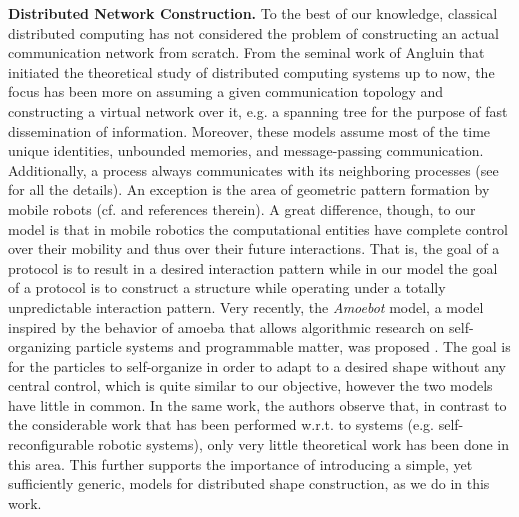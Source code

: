\documentclass[oribibl, 11pt]{llncs}
\begin{document}
\noindent\textbf{Distributed Network Construction.} To the best of our knowledge, classical distributed computing has not considered the problem of constructing an actual communication network from scratch. From the seminal work of Angluin \cite{An80} that initiated the theoretical study of distributed computing systems up to now, the focus has been more on assuming a given communication topology and constructing a virtual network over it, e.g. a spanning tree for the purpose of fast dissemination of information. Moreover, these models assume most of the time unique identities, unbounded memories, and message-passing communication. Additionally, a process always communicates with its neighboring processes (see \cite{Ly96} for all the details). An exception is the area of geometric pattern formation by mobile robots (cf. \cite{SY99,DFSY10} and references therein). A great difference, though, to our model is that in mobile robotics the computational entities have complete control over their mobility and thus over their future interactions. That is, the goal of a protocol is to result in a desired interaction pattern while in our model the goal of a protocol is to construct a structure while operating under a totally unpredictable interaction pattern. Very recently, the \emph{Amoebot} model, a model inspired by the behavior of amoeba that allows algorithmic research on self-organizing particle systems and programmable matter, was proposed \cite{DGRS13,DDGRS14}. The goal is for the particles to self-organize in order to adapt to a desired shape without any central control, which is quite similar to our objective, however the two models have little in common. In the same work, the authors observe that, in contrast to the considerable work that has been performed w.r.t. to systems (e.g. self-reconfigurable robotic systems), only very little theoretical work has been done in this area. This further supports the importance of introducing a simple, yet sufficiently generic, models for distributed shape construction, as we do in this work.\\
\end{document}
